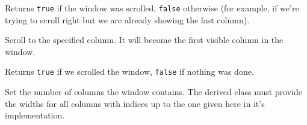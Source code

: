 Returns {\tt true} if the window was scrolled, {\tt false} otherwise (for
example, if we're trying to scroll right but we are already showing the last
column).


\label{wxvarhscrollhelperscrolltocolumn}


Scroll to the specified column. It will become the first visible column in the window.

Returns {\tt true} if we scrolled the window, {\tt false} if nothing was done.


\label{wxvarhscrollhelpersetcolumncount}


Set the number of columns the window contains. The derived class must provide
the widths for all columns with indices up to the one given here in it's
 implementation.



